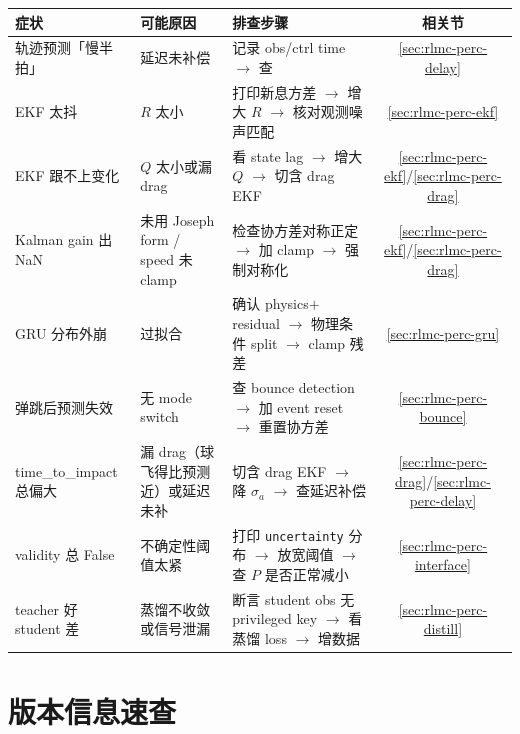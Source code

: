 \begin{center}
\small
\begin{tabular}{@{}p{3.0cm}p{3.0cm}p{5.5cm}c@{}}
\toprule
症状 & 可能原因 & 排查步骤 & 相关节 \\
\midrule
轨迹预测「慢半拍」 & 延迟未补偿 & 记录 obs/ctrl time $\to$ 查 \Verb[breaklines]|compensate_delay| $\to$ 看新息偏移 & \ref{sec:rlmc-perc-delay} \\
EKF 太抖 & $R$ 太小 & 打印新息方差 $\to$ 增大 $R$ $\to$ 核对观测噪声匹配 & \ref{sec:rlmc-perc-ekf} \\
EKF 跟不上变化 & $Q$ 太小或漏 drag & 看 state lag $\to$ 增大 $Q$ $\to$ 切含 drag EKF & \ref{sec:rlmc-perc-ekf}/\ref{sec:rlmc-perc-drag} \\
Kalman gain 出 NaN & 未用 Joseph form / speed 未 clamp & 检查协方差对称正定 $\to$ 加 clamp $\to$ 强制对称化 & \ref{sec:rlmc-perc-ekf}/\ref{sec:rlmc-perc-drag} \\
GRU 分布外崩 & 过拟合 & 确认 physics$+$residual $\to$ 物理条件 split $\to$ clamp 残差 & \ref{sec:rlmc-perc-gru} \\
弹跳后预测失效 & 无 mode switch & 查 bounce detection $\to$ 加 event reset $\to$ 重置协方差 & \ref{sec:rlmc-perc-bounce} \\
time\_to\_impact 总偏大 & 漏 drag（球飞得比预测近）或延迟未补 & 切含 drag EKF $\to$ 降 $\sigma_a$ $\to$ 查延迟补偿 & \ref{sec:rlmc-perc-drag}/\ref{sec:rlmc-perc-delay} \\
validity 总 False & 不确定性阈值太紧 & 打印 \verb|uncertainty| 分布 $\to$ 放宽阈值 $\to$ 查 $P$ 是否正常减小 & \ref{sec:rlmc-perc-interface} \\
teacher 好 student 差 & 蒸馏不收敛或信号泄漏 & 断言 student obs 无 privileged key $\to$ 看蒸馏 loss $\to$ 增数据 & \ref{sec:rlmc-perc-distill} \\
\bottomrule
\end{tabular}
\end{center}

\section*{版本信息速查}
\label{sec:rlmc-perc-versions}


